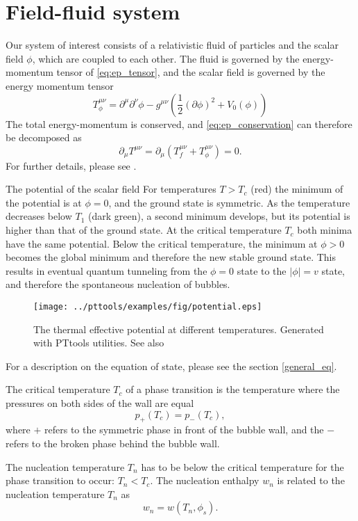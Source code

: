 \section{Field-fluid system}
Our system of interest consists of a relativistic fluid of particles and the scalar field $\phi$,
which are coupled to each other.
The fluid is governed by the energy-momentum tensor of \eqref{eq:ep_tensor},
and the scalar field is governed by the energy momentum tensor
\cites[eq. 5.12]{lecture_notes}[eq. 2.9]{hindmarsh_gw_pt_2019}
\begin{equation}
T_\phi^{\mu \nu}
= \partial^\mu \partial^\nu \phi
- g^{\mu \nu} \left(\frac{1}{2} (\partial \phi)^2 + V_0 (\phi) \right)
\label{eq:ep_tensor_field}
\end{equation}
The total energy-momentum is conserved, and \ref{eq:ep_conservation} can therefore be decomposed as
\cite[eq. 5.17]{lecture_notes}
\begin{equation}
\partial_\mu T^{\mu \nu} = \partial_\mu (T_f^{\mu \nu} + T_\phi^{\mu \nu}) = 0.
\label{eq:ep_conservation_total}
\end{equation}
For further details, please see \cite{moore_pt_1995}.

The potential of the scalar field
For temperatures $T > T_c$ (red) the minimum of the potential is at $\phi = 0$, and the ground state is symmetric.
As the temperature decreases below $T_1$ (dark green), a second minimum develops, but its potential is higher than that of the ground state.
At the critical temperature $T_c$ both minima have the same potential.
Below the critical temperature, the minimum at $\phi > 0$ becomes the global minimum and therefore the new stable ground state.
This results in eventual quantum tunneling from the $\phi = 0$ state to the $|\phi| = v$ state,
and therefore the spontaneous nucleation of bubbles.

\begin{figure}[ht!]
\centering
\texttt{[image: ../pttools/examples/fig/potential.eps]}
\caption{The thermal effective potential at different temperatures. Generated with PTtools utilities. See also \cite[fig. 4]{lecture_notes}}
\label{fig:potential}
\end{figure}



For a description on the equation of state, please see the section \ref{general_eq}.

The critical temperature $T_c$ of a phase transition is the temperature where the pressures on both sides of the wall are equal
\begin{equation}
p_+(T_c) = p_-(T_c),
\label{eq:critical_temp}
\end{equation}
where $+$ refers to the symmetric phase in front of the bubble wall,
and the $-$ refers to the broken phase behind the bubble wall.

The nucleation temperature $T_n$ has to be below the critical temperature for the phase transition to occur: $T_n < T_c$.
The nucleation enthalpy $w_n$ is related to the nucleation temperature $T_n$ as
\begin{equation}
w_n = w(T_n,\phi_s).
\label{eq:wn}
\end{equation}
